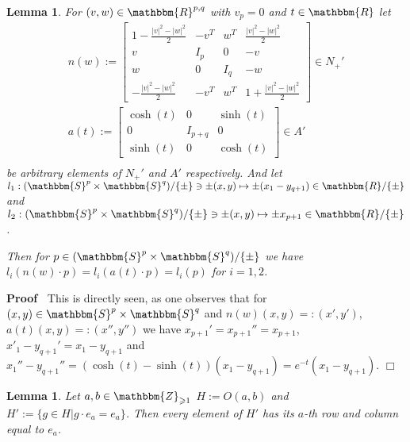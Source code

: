 \documentclass{article}
\newcommand{\assign}{:=}
\renewenvironment{proof}{\noindent\textbf{Proof\ }}{\hspace*{\fill}$\Box$\medskip}
\newtheorem{lemma}[proposition]{Lemma}
\theoremstyle{remark}
\begin{document}
\begin{lemma}
  \label{doublePGP:lem-comput}For $(v, w) \in \mathbbm{R}^{p, q}$ with $v_p =
  0$ and $t \in \mathbbm{R}$ let
  \begin{eqnarray}
    & n (w) \assign \left[ \begin{array}{cccc}
      1 - \frac{| v |^2 - | w |^2}{2} & - v^T & w^T & \frac{| v |^2 - | w
      |^2}{2}\\
      v & I_p & 0 & - v\\
      w & 0 & I_q & - w\\
      - \frac{| v |^2 - | w |^2}{2} & - v^T & w^T & 1 + \frac{| v |^2 - | w
      |^2}{2}
    \end{array} \right] \in N_+' &  \nonumber\\
    & a (t) \assign \left[ \begin{array}{ccc}
      \cosh (t) & 0 & \sinh (t)\\
      0 & I_{p + q} & 0\\
      \sinh (t) & 0 & \cosh (t)
    \end{array} \right] \in A' &  \nonumber\\
    &  &  \nonumber
  \end{eqnarray}
  be arbitrary elements of $N_+'$ and $A'$ respectively. And let $l_1 :
  (\mathbbm{S}^p \times \mathbbm{S}^q) / \{ \pm \} \ni \pm (x, y) \mapsto \pm
  (x_1 - y_{q + 1}) \in \mathbbm{R}/ \{ \pm \}$ and $l_2 : (\mathbbm{S}^p
  \times \mathbbm{S}^q) / \{ \pm \} \ni \pm (x, y) \mapsto \pm x_{p + 1} \in
  \mathbbm{R}/ \{ \pm \}$.
  
  Then for $p \in (\mathbbm{S}^p \times \mathbbm{S}^q) / \{ \pm \}$ we have
  $l_i (n (w) \cdot p) = l_i (a (t) \cdot p) = l_i (p)$ for $i = 1, 2$.
\end{lemma}

\begin{proof}
  This is directly seen, as one observes that for $(x, y) \in \mathbbm{S}^p
  \times \mathbbm{S}^q$ and $n (w) (x, y) = : (x', y')$, $a (t) (x, y) = :
  (x'', y'')$ we have $x_{p + 1}' = x_{p + 1}'' = x_{p + 1}$, $x'_1 - y_{q +
  1}' = x_1 - y_{q + 1}$ and $x_1'' - y_{q + 1}'' = (\cosh (t) - \sinh (t))
  (x_1 - y_{q + 1}) = e^{- t} (x_1 - y_{q + 1})$.
\end{proof}

\begin{lemma}
  \label{doublePGP:lem-zerocolumn}Let $a, b \in \mathbbm{Z}_{\geqslant 1}$ $H
  \assign O (a, b)$ and $H' \assign \{g \in H|g \cdot e_a = e_a \}$. Then
  every element of $H'$ has its $a$-th row and column equal to $e_a$.
\end{lemma}
\end{document}
